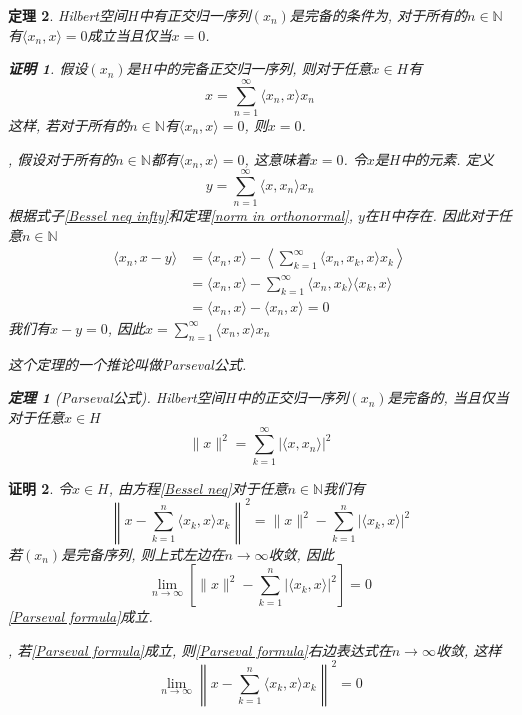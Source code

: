 \documentclass[a4paper,11pt]{article}
\theoremstyle{mystyle}
\newtheorem{theorem}{\hspace{2em}定理}[section]
\newtheorem{Proof}{\hspace{2em}证明}[section]
\begin{document}
\begin{theorem}
  Hilbert空间$H$中有正交归一序列$(x_n)$是完备的条件为, 对于所有的$n\in\mathbb{N}$有$\langle x_n,x\rangle=0$成立当且仅当$x=0$.
  \begin{Proof}
    假设$(x_n)$是$H$中的完备正交归一序列, 则对于任意$x\in H$有
    \begin{equation*}
      x=\sum_{n=1}^{\infty}\langle x_n,x\rangle x_n
    \end{equation*}
    这样, 若对于所有的$n\in \mathbb{N}$有$\langle x_n,x\rangle=0$, 则$x=0$.

    , 假设对于所有的$n\in \mathbb{N}$都有$\langle x_n,x\rangle=0$, 这意味着$x=0$. 令$x$是$H$中的元素. 定义
    \begin{equation*}
      y=\sum_{n=1}^{\infty}\langle x,x_n\rangle x_n
    \end{equation*}
    根据式子\eqref{Bessel neq infty}和定理\ref{norm in orthonormal}, $y$在$H$中存在. 因此对于任意$n\in \mathbb{N}$
    \begin{equation*}
      \begin{split}
         \langle x_n,x-y\rangle & =\langle x_n,x\rangle-\left\langle\sum_{k=1}^{\infty}\langle x_n,x_k,x\rangle x_k\right\rangle \\
           & =\langle x_n,x\rangle-\sum_{k=1}^{\infty}\langle x_n,x_k\rangle\langle x_k,x\rangle \\
           & =\langle x_n,x\rangle-\langle x_n,x\rangle=0
      \end{split}
    \end{equation*}
    我们有$x-y=0$, 因此$x=\sum_{n=1}^{\infty}\langle x_n,x\rangle x_n$
  \end{Proof}
  这个定理的一个推论叫做Parseval公式.
  \begin{theorem}[Parseval公式]
    Hilbert空间$H$中的正交归一序列$(x_n)$是完备的, 当且仅当对于任意$x\in H$
    \begin{equation}\label{Parseval formula}
      \|x\|^2=\sum_{k=1}^{\infty}|\langle x,x_n\rangle|^2
    \end{equation}
  \end{theorem}
\end{theorem}
\begin{Proof}
  令$x\in H$, 由方程\eqref{Bessel neq}对于任意$n\in\mathbb{N}$我们有
  \begin{equation*}
    \left\|x-\sum_{k=1}^{n}\langle x_k,x\rangle x_k\right\|^2=\|x\|^2-\sum_{k=1}^{n}|\langle x_k,x\rangle|^2
  \end{equation*}
  若$(x_n)$是完备序列, 则上式左边在$n\to \infty$收敛, 因此
  \begin{equation*}
    \lim_{n\to\infty}\left[\|x\|^2-\sum_{k=1}^{n}|\langle x_k,x\rangle|^2\right]=0
  \end{equation*}
  \eqref{Parseval formula}成立.

  , 若\eqref{Parseval formula}成立, 则\eqref{Parseval formula}右边表达式在$n\to\infty$收敛, 这样
  \begin{equation*}
    \lim_{n\to\infty}\left\|x-\sum_{k=1}^{n}\langle x_k,x\rangle x_k\right\|^2=0
  \end{equation*}
\end{Proof}
\end{document}

